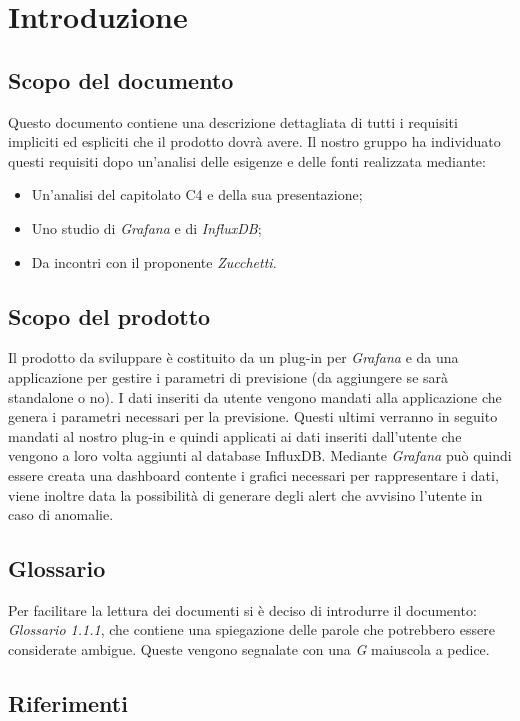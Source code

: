 \documentclass[a4]{article}
\begin{document}
	\section{Introduzione}
		\subsection{Scopo del documento}
			Questo documento contiene una descrizione dettagliata di tutti i requisiti impliciti ed espliciti che il prodotto dovrà avere. Il nostro gruppo ha individuato questi requisiti dopo un'analisi delle esigenze e delle fonti realizzata mediante: 
				\begin{itemize}
					\item Un'analisi del capitolato C4 e della sua presentazione; 
					\item Uno studio di \textit{Grafana} e di \textit{InfluxDB};
					\item Da incontri con il proponente \textit{Zucchetti}.
				\end{itemize}
		\subsection{Scopo del prodotto}
			Il prodotto da sviluppare è costituito da un plug-in per \textit{Grafana} e da una applicazione per gestire i parametri di previsione (da aggiungere se sarà standalone o no). I dati inseriti da utente vengono mandati alla applicazione che genera i parametri necessari per la previsione. Questi ultimi verranno in seguito mandati al nostro plug-in e quindi applicati ai dati inseriti dall'utente che vengono a loro volta aggiunti al database InfluxDB. Mediante \textit{Grafana} può quindi essere creata una dashboard contente i grafici necessari per rappresentare i dati, viene inoltre data la possibilità di generare degli alert che avvisino l'utente in caso di anomalie.
		
		\subsection{Glossario}
			Per facilitare la lettura dei documenti si è deciso di introdurre il documento: \textit{Glossario 1.1.1}, che contiene una spiegazione delle parole che potrebbero essere considerate ambigue. Queste vengono segnalate con una \textit{G} maiuscola a pedice.  
		\subsection{Riferimenti}
\end{document}
